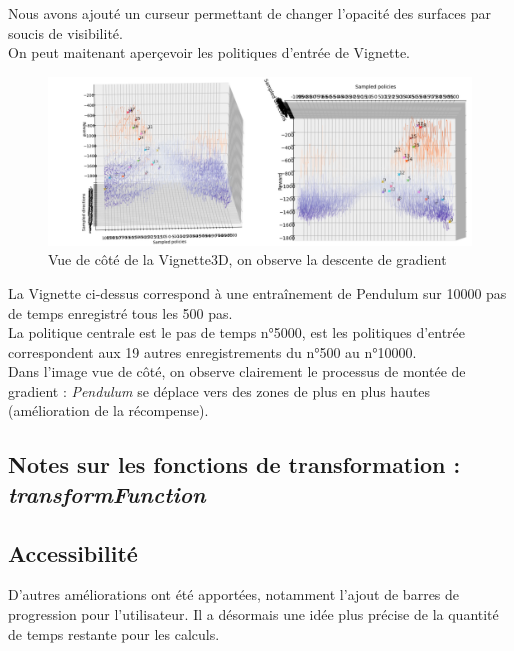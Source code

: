 \documentclass[12pt]{article}
\begin{document}
Nous avons ajouté un curseur permettant de changer l'opacité des surfaces par soucis de visibilité. \\

On peut maitenant aperçevoir les politiques d'entrée de Vignette. \\

\begin{figure}[htp]
    \centering
    \includegraphics[width=15cm]{Images/vignette_cote}
    \caption{Vue de côté de la Vignette3D, on observe la descente de gradient}
    \label{fig:vignetteCote}
\end{figure}

\newpage
La Vignette ci-dessus correspond à une entraînement de Pendulum sur 10000 pas de temps enregistré tous les 500 pas. \\

La politique centrale est le pas de temps n°5000, est les politiques d'entrée correspondent aux 19 autres enregistrements du n°500 au n°10000. \\

Dans l'image vue de côté, on observe clairement le processus de montée de gradient : \emph{Pendulum} se déplace vers des zones de plus en plus hautes (amélioration de la récompense). \\

\subsection{Notes sur les fonctions de transformation : \emph{transformFunction}}


\subsection{Accessibilité}

D’autres améliorations ont été apportées, notamment l’ajout de barres de progression pour l’utilisateur. Il a désormais une idée plus précise de la quantité de temps restante pour les calculs. \\
\end{document}
